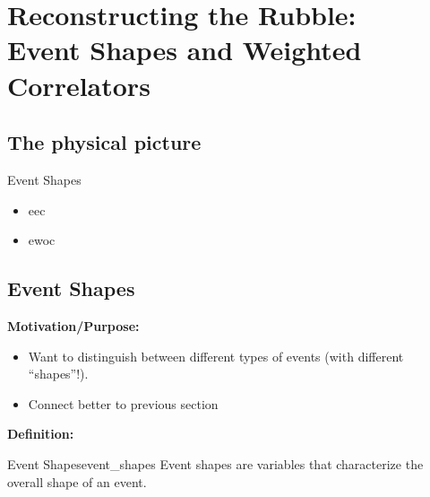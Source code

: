 \chapter[Reconstructing the Rubble: Event Shapes and Weighted Correlators]{Reconstructing the Rubble:\\Event Shapes and Weighted Correlators}

\section{The physical picture}



\begin{sambox}{Event Shapes}{}
    \begin{itemize}
        \item
            \gls{eec}

        \item
            \gls{ewoc}
    \end{itemize}
\end{sambox}





\section{Event Shapes}

\begin{sambox}
    \textbf{Motivation/Purpose:}
    \begin{itemize}
        \item
            Want to distinguish between different types of events (with different ``shapes''!).

        \item
            Connect better to previous section
    \end{itemize}

    \textbf{Definition:}
    \begin{definitionbox}{Event Shapes}{event_shapes}
        Event shapes are variables that characterize the overall shape of an event.
    \end{definitionbox}
\end{sambox}


